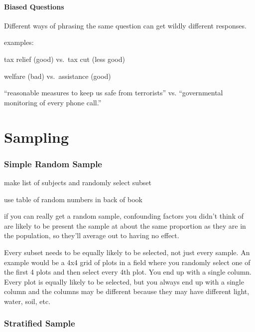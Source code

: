 \documentclass[landscape]{exam}
\begin{document}
  \subsection{Biased Questions}

  Different ways of phrasing the same question can get wildly different
  responses.

  examples:
  \begin{itemize*}
    \item tax relief (good) vs.\ tax cut (less good)
    \item welfare (bad) vs.\ assistance (good)
    \item ``reasonable measures to keep us safe from terrorists'' vs.
      ``governmental monitoring of every phone call.''
  \end{itemize*}

  \part{Sampling}

  \section{Simple Random Sample}
  \begin{itemize*}
    \item make list of subjects and randomly select subset
    \item use table of random numbers in back of book
    \item if you can really get a random sample, confounding factors you didn't
      think of are likely to be present the sample at about the same proportion
      as they are in the population, so they'll average out to having no effect.
  \end{itemize*}

  Every subset needs to be equally likely to be selected, not just every
  sample. An example would be a 4x4 grid of plots in a field where you randomly select
  one of the first 4 plots and then select every 4th plot. You end up with a
  single column. Every plot is equally likely to be selected, but you always end
  up with a single column and the columns may be different because they may have
  different light, water, soil, etc.

  \section{Stratified Sample}
\end{document}

